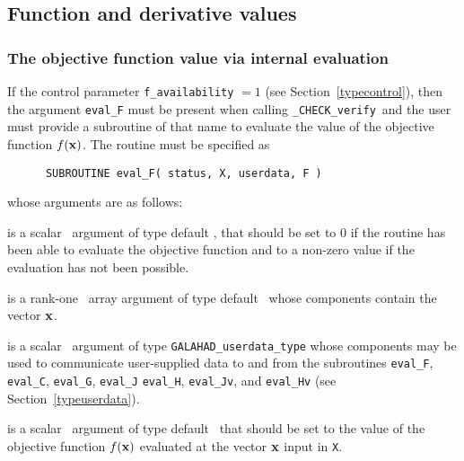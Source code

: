 \documentclass{galahad}
\newcommand{\packagename}{CHECK}
\newcommand{\fullpackagename}{\libraryname\_\packagename}
\newcommand{\solver}{{\tt \fullpackagename\_verify}}
\begin{document}

\subsection{Function and derivative values\label{fdv}}


\subsubsection{The objective function value via internal evaluation\label{ffv}}

If the control parameter {\tt f\_availability} $=1$ (see
Section~\ref{typecontrol}), then the argument
{\tt eval\_F} must be present when calling \solver\ and the
user must provide a subroutine of that name to evaluate the
value of the objective function $f({\mathbf{x}})$.
The routine must be specified as

\def\baselinestretch{0.8}
{\tt \begin{verbatim}
      SUBROUTINE eval_F( status, X, userdata, F ) \end{verbatim} }
\def\baselinestretch{1.0}
\noindent whose arguments are as follows:

\begin{description}
 is a scalar \intentout\ argument of type default \integer,
that should be set to 0 if the routine has been able to evaluate 
the objective function
and to a non-zero value if the evaluation has not been possible.

 is a rank-one \intentin\ array argument of type default \realdp\
whose components contain the vector ${\mathbf{x}}$.

 is a scalar \intentinout\ argument of type 
{\tt GALAHAD\_userdata\_type} whose components may be used
to communicate user-supplied data to and from the
subroutines {\tt eval\_F}, {\tt eval\_C}, {\tt eval\_G}, {\tt eval\_J}
{\tt eval\_H}, {\tt eval\_Jv}, and {\tt eval\_Hv} 
(see Section~\ref{typeuserdata}). 

 is a scalar \intentout\ argument of type default \realdp\
that should be set to the value of the objective function $f({\mathbf{x}})$
evaluated at the vector ${\mathbf{x}}$ input in {\tt X}.

\end{description}

\end{document}
